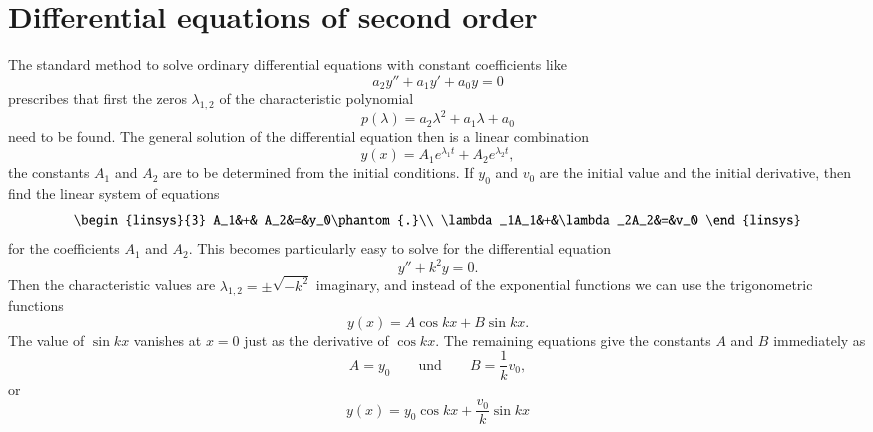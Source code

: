 %
%
%
\section{Differential equations of second order}
The standard method to solve ordinary differential equations
with constant coefficients like
\[
a_2y''+ a_1y'+a_0y=0
\]
prescribes that first the zeros $\lambda_{1,2}$ of the characteristic
polynomial
\[
p(\lambda)=a_2\lambda^2+a_1\lambda+a_0
\]
need to be found.
The general solution of the differential equation then is a linear
combination
\[
y(x)=
A_1 e^{\lambda_1t}
+
A_2 e^{\lambda_2t},
\]
the constants $A_1$ and $A_2$ are to be determined from the initial
conditions.
If $y_0$ and $v_0$ are the initial value and the initial derivative,
then find the linear system of equations
\[
\begin{linsys}{3}
         A_1&+&         A_2&=&y_0\phantom{.}\\
\lambda_1A_1&+&\lambda_2A_2&=&v_0
\end{linsys}
\]
for the coefficients $A_1$ and $A_2$.
This becomes particularly easy to solve for the differential equation
\[
y''+k^2 y=0.
\]
Then the characteristic values are $\lambda_{1,2}=\pm\sqrt{-k^2}$ imaginary,
and instead of the exponential functions we can use the trigonometric
functions
\[
y(x)=A\cos kx+B\sin kx.
\]
The value of $\sin kx$ vanishes at $x=0$ just as the derivative
of $\cos kx$.
The remaining equations give the constants $A$ and $B$ immediately as
\[
A=y_0
\qquad\text{und}\qquad
B=\frac1kv_0,
\]
or
\begin{equation}
y(x)=y_0\cos kx + \frac{v_0}{k}\sin kx
\label{hyp:loesung}
\end{equation}

